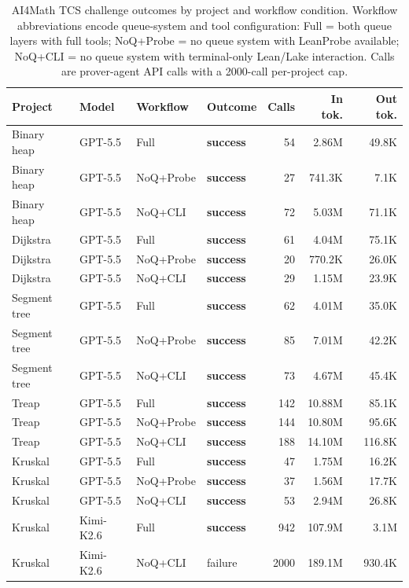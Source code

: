 \documentclass{article}
\newcommand{\kimi}{Kimi-K2.6\xspace}
\newcommand{\gpt}{GPT-5.5\xspace}
\newcommand{\lean}{Lean\xspace}
\begin{document}
\begin{table}[!b]
\centering
\caption{AI4Math TCS challenge outcomes by project and workflow condition. Workflow abbreviations encode queue-system and tool configuration: Full = both queue layers with full tools; NoQ+Probe = no queue system with LeanProbe available; NoQ+CLI = no queue system with terminal-only \lean/Lake interaction. Calls are prover-agent API calls with a 2000-call per-project cap.}
\label{tab:proof-experiments}
\footnotesize
\setlength{\tabcolsep}{3pt}
\begin{tabular*}{\textwidth}{@{\extracolsep{\fill}}llllrrr@{}}
\toprule
Project & Model & Workflow & Outcome & Calls & In tok. & Out tok. \\
\midrule
Binary heap & \gpt & Full & \textbf{success} & 54 & 2.86M & 49.8K \\
Binary heap & \gpt & NoQ+Probe & \textbf{success} & 27 & 741.3K & 7.1K \\
Binary heap & \gpt & NoQ+CLI & \textbf{success} & 72 & 5.03M & 71.1K \\
\midrule
Dijkstra & \gpt & Full & \textbf{success} & 61 & 4.04M & 75.1K \\
Dijkstra & \gpt & NoQ+Probe & \textbf{success} & 20 & 770.2K & 26.0K \\
Dijkstra & \gpt & NoQ+CLI & \textbf{success} & 29 & 1.15M & 23.9K \\
\midrule
Segment tree & \gpt & Full & \textbf{success} & 62 & 4.01M & 35.0K \\
Segment tree & \gpt & NoQ+Probe & \textbf{success} & 85 & 7.01M & 42.2K \\
Segment tree & \gpt & NoQ+CLI & \textbf{success} & 73 & 4.67M & 45.4K \\
\midrule
Treap & \gpt & Full & \textbf{success} & 142 & 10.88M & 85.1K \\
Treap & \gpt & NoQ+Probe & \textbf{success} & 144 & 10.80M & 95.6K \\
Treap & \gpt & NoQ+CLI & \textbf{success} & 188 & 14.10M & 116.8K \\
\midrule
Kruskal & \gpt & Full & \textbf{success} & 47 & 1.75M & 16.2K \\
Kruskal & \gpt & NoQ+Probe & \textbf{success} & 37 & 1.56M & 17.7K \\
Kruskal & \gpt & NoQ+CLI & \textbf{success} & 53 & 2.94M & 26.8K \\
\midrule
Kruskal & \kimi & Full & \textbf{success} & 942 & 107.9M & 3.1M \\
Kruskal & \kimi & NoQ+CLI & failure & 2000 & 189.1M & 930.4K \\
\bottomrule
\end{tabular*}
\end{table}
\end{document}
